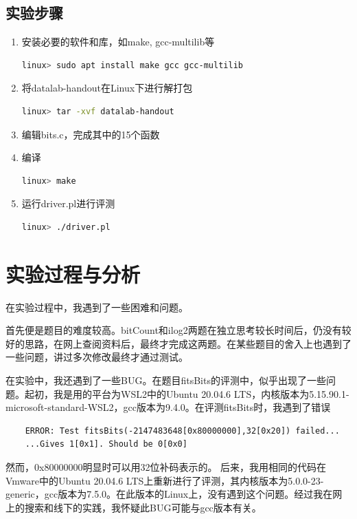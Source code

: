 \documentclass{article}
\begin{document}
\subsection{实验步骤}
\large
\begin{enumerate}[1)]
    \item 安装必要的软件和库，如make, gcc-multilib等
    \begin{lstlisting}[language=bash]
    linux> sudo apt install make gcc gcc-multilib
    \end{lstlisting}  
    \item 将datalab-handout在Linux下进行解打包
    \begin{lstlisting}[language=bash]
    linux> tar -xvf datalab-handout
    \end{lstlisting} 
    \item 编辑bits.c，完成其中的15个函数
    \item 编译
    \begin{lstlisting}[language=bash]
    linux> make
    \end{lstlisting} 
    \item 运行driver.pl进行评测
    \begin{lstlisting}[language=bash]
    linux> ./driver.pl
    \end{lstlisting} 
\end{enumerate}
\normalsize
\section{实验过程与分析}
\large
在实验过程中，我遇到了一些困难和问题。

首先便是题目的难度较高。bitCount和ilog2两题在独立思考较长时间后，仍没有较好的思路，在网上查阅资料后，最终才完成这两题。在某些题目的舍入上也遇到了一些问题，讲过多次修改最终才通过测试。

在实验中，我还遇到了一些BUG。在题目fitsBits的评测中，似乎出现了一些问题。起初，我是用的平台为WSL2中的Ubuntu 20.04.6 LTS，内核版本为5.15.90.1-microsoft-standard-WSL2，gcc版本为9.4.0。在评测fitsBits时，我遇到了错误

\begin{lstlisting}
    ERROR: Test fitsBits(-2147483648[0x80000000],32[0x20]) failed...
    ...Gives 1[0x1]. Should be 0[0x0]
\end{lstlisting} 
然而，0x80000000明显时可以用32位补码表示的。
后来，我用相同的代码在Vmware中的Ubuntu 20.04.6 LTS上重新进行了评测，其内核版本为5.0.0-23-generic，gcc版本为7.5.0。在此版本的Linux上，没有遇到这个问题。经过我在网上的搜索和线下的实践，我怀疑此BUG可能与gcc版本有关。
\end{document}
